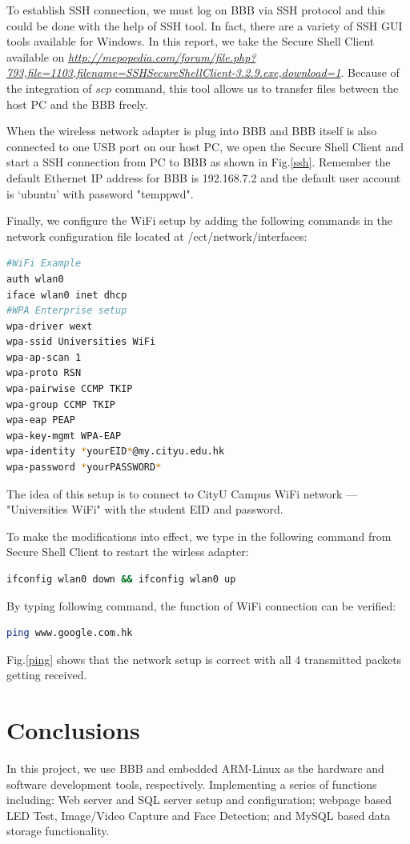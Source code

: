 \documentclass[13pt,journal,draftclsnofoot,onecolumn]{IEEEtran}
\begin{document}
To establish SSH connection, we must log on BBB via SSH protocol and this could be done with the help of SSH tool. In fact, there are a variety of SSH GUI tools available for Windows. In this report, we take the Secure Shell Client available on \textcolor{blue}{\textit{\url{http://mepopedia.com/forum/file.php?793,file=1103,filename=SSHSecureShellClient-3.2.9.exe,download=1}}}. Because of the integration of $scp$ command, this tool allows us to transfer files between the host PC and the BBB freely.

When the wireless network adapter is plug into BBB and BBB itself is also connected to one USB port on our host PC, we open the Secure Shell Client and start a SSH connection from PC to BBB as shown in Fig.\ref{ssh}. Remember the default Ethernet IP address for BBB is 192.168.7.2 and the default user account is `ubuntu' with password "temppwd".

Finally, we configure the WiFi setup by adding the following commands in the network configuration file located at /ect/network/interfaces:
\begin{lstlisting}[language={bash}]
#WiFi Example
auth wlan0
iface wlan0 inet dhcp
#WPA Enterprise setup
wpa-driver wext
wpa-ssid Universities WiFi
wpa-ap-scan 1
wpa-proto RSN
wpa-pairwise CCMP TKIP
wpa-group CCMP TKIP
wpa-eap PEAP
wpa-key-mgmt WPA-EAP
wpa-identity *yourEID*@my.cityu.edu.hk
wpa-password *yourPASSWORD*
\end{lstlisting}
The idea of this setup is to connect to CityU Campus WiFi network --- "Universities WiFi" with the student EID and password.

To make the modifications into effect, we type in the following command from Secure Shell Client to restart the wirless adapter:
\begin{lstlisting}[language={bash}]
ifconfig wlan0 down && ifconfig wlan0 up
\end{lstlisting}
By typing following command, the function of WiFi connection can be verified:
\begin{lstlisting}[language={bash}]
ping www.google.com.hk
\end{lstlisting}
Fig.\ref{ping} shows that the network setup is correct with all 4 transmitted packets getting received.





\section{Conclusions}\label{Con}
In this project, we use BBB and embedded ARM-Linux as the hardware and software development tools, respectively. Implementing a series of functions including: Web server and SQL server setup and configuration; webpage based LED Test, Image/Video Capture and Face Detection; and MySQL based data storage functionality.




\clearpage
\end{document}
